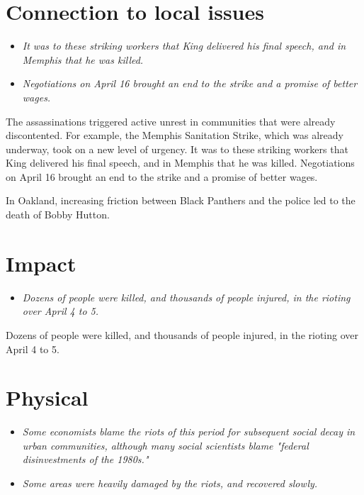 \section{Connection to local issues}\label{connection-to-local-issues}

\begin{itemize}
\item
  \emph{It was to these striking workers that King delivered his final
  speech, and in Memphis that he was killed.}
\item
  \emph{Negotiations on April 16 brought an end to the strike and a
  promise of better wages.}
\end{itemize}

The assassinations triggered active unrest in communities that were
already discontented. For example, the Memphis Sanitation Strike, which
was already underway, took on a new level of urgency. It was to these
striking workers that King delivered his final speech, and in Memphis
that he was killed. Negotiations on April 16 brought an end to the
strike and a promise of better wages.

In Oakland, increasing friction between Black Panthers and the police
led to the death of Bobby Hutton.

\section{Impact}\label{impact}

\begin{itemize}
\item
  \emph{Dozens of people were killed, and thousands of people injured,
  in the rioting over April 4 to 5.}
\end{itemize}

Dozens of people were killed, and thousands of people injured, in the
rioting over April 4 to 5.

\section{Physical}\label{physical}

\begin{itemize}
\item
  \emph{Some economists blame the riots of this period for subsequent
  social decay in urban communities, although many social scientists
  blame "federal disinvestments of the 1980s."}
\item
  \emph{Some areas were heavily damaged by the riots, and recovered
  slowly.}
\end{itemize}

